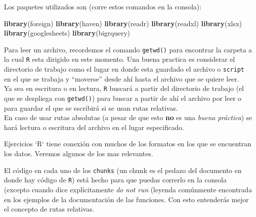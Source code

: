 \documentclass[]{article}
\newenvironment{Shaded}{\begin{snugshade}}{\end{snugshade}}
\newcommand{\KeywordTok}[1]{\textcolor[rgb]{0.13,0.29,0.53}{\textbf{#1}}}
\newcommand{\NormalTok}[1]{#1}
\begin{document}
Los paquetes utilizados son (corre estos comandos en la consola):

\begin{Shaded}
\begin{Highlighting}[]
\KeywordTok{library}\NormalTok{(foreign)}
\KeywordTok{library}\NormalTok{(haven)}
\KeywordTok{library}\NormalTok{(readr)}
\KeywordTok{library}\NormalTok{(readxl)}
\KeywordTok{library}\NormalTok{(xlsx)}
\KeywordTok{library}\NormalTok{(googlesheets)}
\KeywordTok{library}\NormalTok{(bigrquery)}
\end{Highlighting}
\end{Shaded}

\begin{nota}

Para leer un archivo, recordemos el comando \texttt{getwd()} para encontrar la carpeta
a la cual \texttt{R} esta dirigido en este momento. Una buena practica es considerar 
el directorio de trabajo como el lugar en donde esta guardado el archivo o \texttt{script} en el que se trabaja y ``moverse'' desde ahí hasta el archivo que se quiere leer.\\

Ya sea en escritura o en lectura, \texttt{R} buscará a partir del directorio
de trabajo (el que se despliega con \texttt{getwd()}) para buscar a partir 
de ahí el archivo por leer o para guardar el que se escribirá si se usan rutas
relativas.\\

En caso de usar rutas absolutas (a pesar de que esto \textbf{no} es una \textit{buena práctica}) se
hará lectura o escritura del archivo en el lugar especificado.
\end{nota}

\vspace{1cm}

\renewcommand\bcStyleTitre[1]{\large\textcolor{bbblack}{#1}}

\begin{bclogo}[
  couleur=llred,
  arrondi=0,
  logo=\bcstop,
  barre=none,
  noborder=true]{Ejercicios}
`R` tiene conexión con muchos de los formatos en los que se encuentran 
los datos. Veremos algunos de los mas relevantes.

El código en cada uno de los \texttt{chunks} (un chunk es el pedazo del documento
en donde hay código de \texttt{R}) está hecho para que puedas correrlo en la
consola (excepto cuando dice explícitamente \textit{do not run} (leyenda
comúnmente encontrada en los ejemplos de la documentación de las funciones. 
Con esto entenderás mejor el concepto de rutas relativas.
\end{bclogo}
\end{document}
